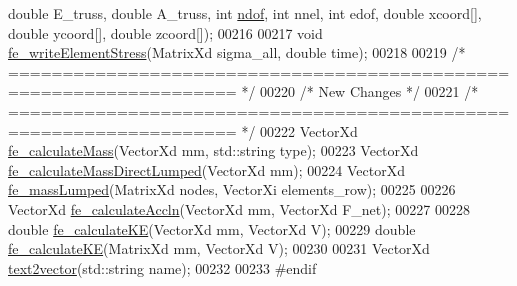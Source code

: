 \begin{DoxyCode}
{      double} E\_truss, \textcolor{keywordtype}{double} A\_truss, \textcolor{keywordtype}{int} \hyperlink{_global_variables_8h_aa789fe4d8a13fd0990b630909430d5d0}{ndof}, \textcolor{keywordtype}{int} nnel, \textcolor{keywordtype}{int} edof, \textcolor{keywordtype}{double} xcoord[], \textcolor{keywordtype}{double} ycoord[], \textcolor{keywordtype}{double} 
      zcoord[]);
00216 
00217 \textcolor{keywordtype}{void} \hyperlink{functions_8h_a9dec90c41460e15aa1d8dce787683406}{fe\_writeElementStress}(MatrixXd sigma\_all, \textcolor{keywordtype}{double} time);
00218 
00219 \textcolor{comment}{/* =================================================================== */}
00220 \textcolor{comment}{/* New Changes */}
00221 \textcolor{comment}{/* =================================================================== */}
00222 VectorXd \hyperlink{functions_8h_abeed10bd80ae1f3c95d79c4aed512d8f}{fe\_calculateMass}(VectorXd mm, std::string type);
00223 VectorXd \hyperlink{functions_8h_aca6d101baf8887cf61064067985cbd62}{fe\_calculateMassDirectLumped}(VectorXd mm);
00224 VectorXd \hyperlink{functions_8h_aa34a87447bf9fa851463ce99101a7054}{fe\_massLumped}(MatrixXd nodes, VectorXi elements\_row);
00225 
00226 VectorXd \hyperlink{functions_8h_a049ed85fefb5b5e80e42432fdcc640fa}{fe\_calculateAccln}(VectorXd mm, VectorXd F\_net);
00227 
00228 \textcolor{keywordtype}{double} \hyperlink{functions_8h_afb8a8298008daf8f2e705a9acb72b984}{fe\_calculateKE}(VectorXd mm, VectorXd V);
00229 \textcolor{keywordtype}{double} \hyperlink{functions_8h_afb8a8298008daf8f2e705a9acb72b984}{fe\_calculateKE}(MatrixXd mm, VectorXd V);
00230 
00231 VectorXd \hyperlink{functions_8h_a708d7eae199de06b3c6627cc90bf569e}{text2vector}(std::string name);
00232 
00233 \textcolor{preprocessor}{#endif}
\end{DoxyCode}
